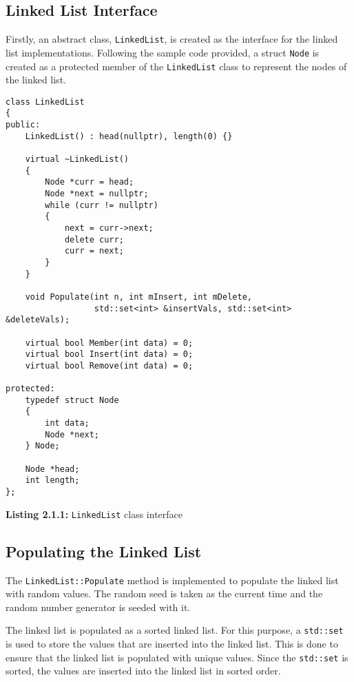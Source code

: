 \documentclass[a4paper,12pt]{article}
\begin{document}
\subsection{Linked List Interface}

Firstly, an abstract class, \lstinline|LinkedList|, is created as the interface for the linked list implementations. Following the sample code provided, a struct \lstinline|Node| is created as a protected member of the \lstinline|LinkedList| class to represent the nodes of the linked list.

\begin{lstlisting}
class LinkedList
{
public:
    LinkedList() : head(nullptr), length(0) {}

    virtual ~LinkedList()
    {
        Node *curr = head;
        Node *next = nullptr;
        while (curr != nullptr)
        {
            next = curr->next;
            delete curr;
            curr = next;
        }
    }

    void Populate(int n, int mInsert, int mDelete,
                  std::set<int> &insertVals, std::set<int> &deleteVals);

    virtual bool Member(int data) = 0;
    virtual bool Insert(int data) = 0;
    virtual bool Remove(int data) = 0;

protected:
    typedef struct Node
    {
        int data;
        Node *next;
    } Node;

    Node *head;
    int length;
};
\end{lstlisting}
\begin{center}
    \textbf{Listing 2.1.1:} \lstinline|LinkedList| class interface
\end{center}

\subsection{Populating the Linked List}

The \lstinline|LinkedList::Populate| method is implemented to populate the linked list with random values. The random seed is taken as the current time and the random number generator is seeded with it.

The linked list is populated as a sorted linked list. For this purpose, a \lstinline|std::set| is used to store the values that are inserted into the linked list. This is done to ensure that the linked list is populated with unique values. Since the \lstinline|std::set| is sorted, the values are inserted into the linked list in sorted order.
\end{document}
